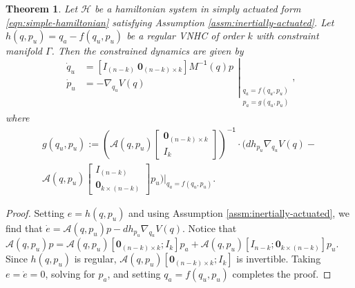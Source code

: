 \documentclass[journal,twoside,web, onecolumn, draftcls]{ieeecolor}
\newtheorem{thm}{Theorem}%
\newcommand*{\inv}{^\mathsf{-1}}
\newcommand*{\Minv}{M^\mathsf{-1}}
\newcommand*{\Id}[1]{I_{#1}}
\newcommand*{\Zmat}[1]{\bm{0}_{#1}}
\begin{document}
\begin{thm}\label{thm:zero-dynamics}
    Let \(\mathcal{H}\) be a hamiltonian system in simply actuated form
    \eqref{eqn:simple-hamiltonian} satisfying
    Assumption \ref{assm:inertially-actuated}. 
    Let \(h(q,p_u) = q_a - f(q_u,p_u)\) be a regular VNHC of order \(k\) with
    constraint manifold \(\Gamma\). 
    Then the constrained dynamics are given by
    \begin{equation}\label{eqn:qpu-dynamics}
        \left.\begin{aligned}
                \dot{q}_u &= 
                \left[\Id{(n-k)} ~ \Zmat{(n-k) \times k}\right]
                \Minv(q)p \\
            \dot{p}_u &= -\nabla_{q_u}V(q) \\
            \end{aligned}{}\right|_{\begin{array}{c}
                q_a = f(q_u,p_u) \\ 
                p_a = g(q_u,p_u) \\
            \end{array}}
            ,
    \end{equation}
    where
    \begin{multline}\label{eqn:g-qpu}
        g(q_u,p_u) := \left( \mathcal{A}(q,p_u)
        \begin{bmatrix} \Zmat{(n-k)\times k} \\ \Id{k} \end{bmatrix}\right)\inv 
        \cdot
        \Big(dh_{p_u}\nabla_{q_u}V(q) -
        \\
        \mathcal{A}(q,p_u)
        \begin{bmatrix} \Id{(n-k)} \\ \Zmat{k \times (n-k)} \end{bmatrix} p_u
        \left.\Big)\right|_{q_a = f(q_u,p_u)}
        .
    \end{multline}

\end{thm}
\begin{proof}
    Setting \(e = h(q,p_u)\) and using Assumption
    \ref{assm:inertially-actuated}, we find that
    \(\dot{e} = \mathcal{A}(q,p_u)p - dh_{p_u}\nabla_{q_u}V(q)\).
    Notice that
    \(\mathcal{A}(q,p_u)p = \mathcal{A}(q,p_u)[\Zmat{(n-k)\times k}; \Id{k}]p_a
    + \mathcal{A}(q,p_u)[\Id{n-k};\Zmat{k \times (n-k)}] p_u\).
    Since \(h(q,p_u)\) is regular,
    \(\mathcal{A}(q,p_u)[\Zmat{(n-k)\times k}; \Id{k}]\) is invertible.
    Taking \(e = \dot{e} = 0\), solving for \(p_a\), and setting 
    \(q_a = f(q_u,p_u)\) completes the proof.
\end{proof}
\end{document}
